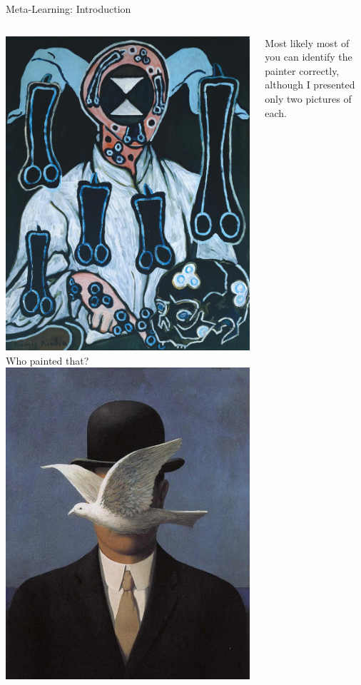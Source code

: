 \begin{frame}[c]{Meta-Learning: Introduction}
\begin{columns}
	\includegraphics[width=.7\textwidth]{w07_hpo_grey_box/images/meta_learning/picabia_1.jpg}
	\centering
	Who painted that?
	\includegraphics[width=.8\textwidth]{w07_hpo_grey_box/images/meta_learning/magritte_3.jpg}
	
	\pause
	Most likely most of you can identify the painter correctly, 
	although I presented only two pictures of each.
\end{columns}

\end{frame}
